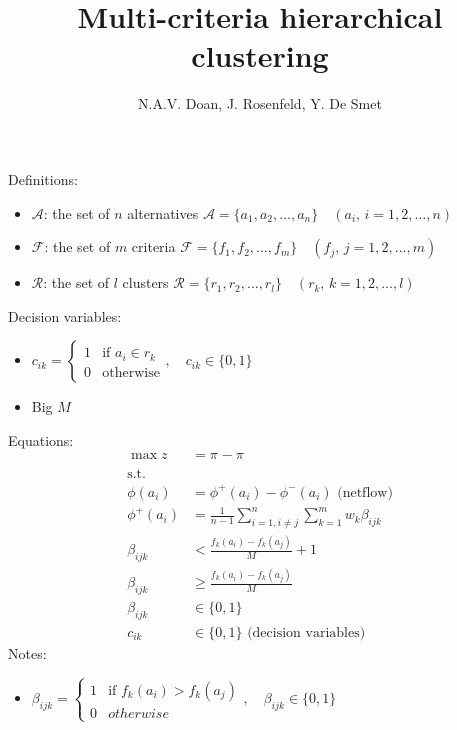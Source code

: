\documentclass[a4paper]{journal}
\title{Multi-criteria hierarchical clustering}
\author{N.A.V. Doan, J. Rosenfeld, Y. De Smet}
\date{}
\begin{document}
    \maketitle
    Definitions:
    \begin{itemize}
        \item $\mathcal{A}$: the set of $n$ alternatives $\mathcal{A} = \{a_1, a_2, \dots, a_n\} \quad (a_i,\, i = 1, 2, \dots, n)$
        \item $\mathcal{F}$: the set of $m$ criteria $\mathcal{F} = \{f_1, f_2, \dots, f_m\} \quad (f_j,\, j = 1, 2, \dots, m)$
        \item $\mathcal{R}$: the set of $l$ clusters $\mathcal{R} = \{r_1, r_2, \dots, r_l\} \quad (r_k,\, k = 1, 2, \dots, l)$
    \end{itemize}
    Decision variables:
    \begin{itemize}
        \item $c_{ik} = \begin{cases}
            1 & \text{if } a_i \in r_k \\
            0 & \text{otherwise}
        \end{cases}, \quad c_{ik} \in \{0, 1\}$
        \item Big $M$
    \end{itemize}
    Equations:
    \begin{align*}
        \max z &= \pi_{} - \pi_{}\\
        \text{s.t.} & \\
        \phi(a_i) &= \phi^+(a_i) - \phi^-(a_i) \text{ (netflow)} \\
        \phi^+(a_i) &= \frac{1}{n-1} \sum_{i=1, i\neq j}^{n} \sum_{k=1}^{m} w_k \beta_{ijk} \\
        \beta_{ijk} &< \frac{f_k(a_i)-f_k(a_j)}{M} + 1 \\
        \beta_{ijk} &\geq \frac{f_k(a_i)-f_k(a_j)}{M} \\
        \beta_{ijk} &\in \{0,1\}\\
        c_{ik} &\in \{0, 1\} \text{ (decision variables)}
    \end{align*}
    Notes:
    \begin{itemize}
        \item $\beta_{ijk} = \begin{cases}
            1 & \text{if } f_k(a_i) > f_k(a_j) \\
            0 & otherwise
        \end{cases}, \quad \beta_{ijk} \in \{0, 1\}$
    \end{itemize}
\end{document}
